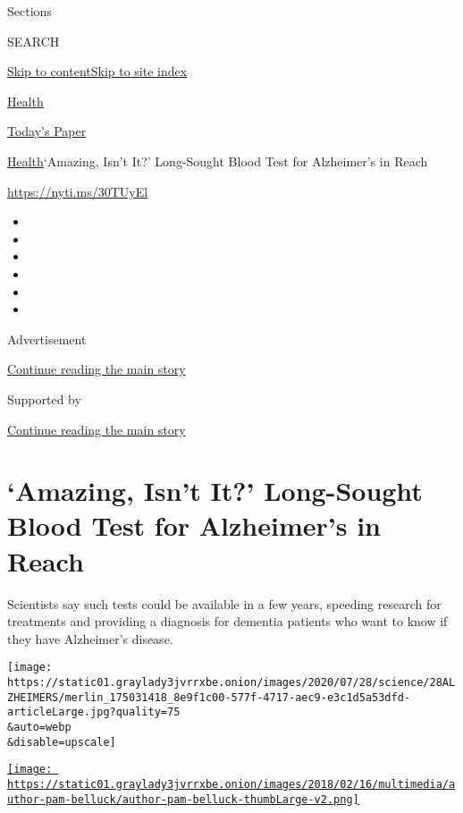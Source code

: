 Sections

SEARCH

\protect\hyperlink{site-content}{Skip to
content}\protect\hyperlink{site-index}{Skip to site index}

\href{https://www.nytimes3xbfgragh.onion/section/health}{Health}

\href{https://myaccount.nytimes3xbfgragh.onion/auth/login?response_type=cookie\&client_id=vi}{}

\href{https://www.nytimes3xbfgragh.onion/section/todayspaper}{Today's
Paper}

\href{/section/health}{Health}\textbar{}`Amazing, Isn't It?' Long-Sought
Blood Test for Alzheimer's in Reach

\url{https://nyti.ms/30TUyEl}

\begin{itemize}
\item
\item
\item
\item
\item
\item
\end{itemize}

Advertisement

\protect\hyperlink{after-top}{Continue reading the main story}

Supported by

\protect\hyperlink{after-sponsor}{Continue reading the main story}

\hypertarget{amazing-isnt-it-long-sought-blood-test-for-alzheimers-in-reach}{%
\section{`Amazing, Isn't It?' Long-Sought Blood Test for Alzheimer's in
Reach}\label{amazing-isnt-it-long-sought-blood-test-for-alzheimers-in-reach}}

Scientists say such tests could be available in a few years, speeding
research for treatments and providing a diagnosis for dementia patients
who want to know if they have Alzheimer's disease.

\texttt{[image: https://static01.graylady3jvrrxbe.onion/images/2020/07/28/science/28ALZHEIMERS/merlin\_175031418\_8e9f1c00-577f-4717-aec9-e3c1d5a53dfd-articleLarge.jpg?quality=75\\\&auto=webp\\\&disable=upscale]}

\href{https://www.nytimes3xbfgragh.onion/by/pam-belluck}{\texttt{[image: https://static01.graylady3jvrrxbe.onion/images/2018/02/16/multimedia/author-pam-belluck/author-pam-belluck-thumbLarge-v2.png]}}

